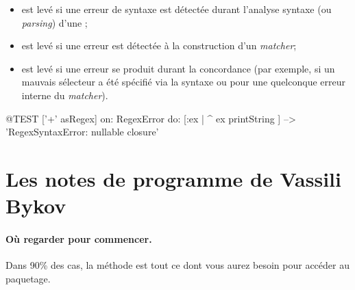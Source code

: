 \documentclass[a4paper,10pt,twoside]{book}
\begin{document}
\begin{itemize}
\item {} est levé si une erreur de syntaxe est
  détectée durant l'analyse syntaxe (ou \emph{parsing}) d'une \expreg;
\item {} est levé si une erreur est
  détectée à la construction d'un \emph{matcher};
\item {} est levé si une erreur se produit
  durant la concordance (par exemple, si un mauvais sélecteur a été
  spécifié via la syntaxe  ou pour une quelconque
  erreur interne du \emph{matcher}).



\end{itemize}


\begin{code}{@TEST}
['+' asRegex] on: RegexError do: [:ex | ^ ex printString ]                                        --> 'RegexSyntaxError:  nullable closure'
\end{code}
\section{Les notes de programme de Vassili Bykov}

\paragraph{Où regarder pour commencer.}
Dans 90\% des cas, la méthode  est tout
ce dont vous aurez besoin pour accéder au paquetage.
\end{document}
